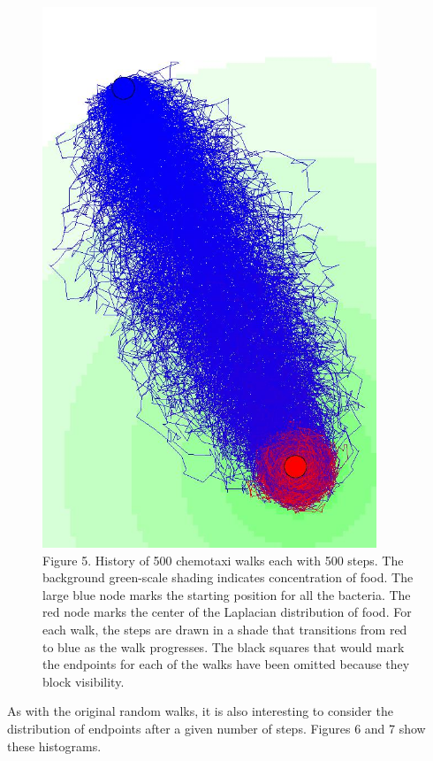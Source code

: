 \documentclass{article}
\begin{document}
\begin{figure}[h]
\centering
\includegraphics[width=10cm,keepaspectratio]{images/chemotaxi-paths-large.jpg}
\captionsetup{labelformat=empty} \caption{Figure 5. History of 500 chemotaxi walks each with 500 steps. The background green-scale shading indicates concentration of food. The large blue node marks the starting position for all the bacteria. The red node marks the center of the Laplacian distribution of food. For each walk, the steps are drawn in a shade that transitions from red to blue as the walk progresses. The black squares that would mark the endpoints for each of the walks have been omitted because they block visibility.}
\end{figure}



  As with the original random walks, it is also interesting to consider the distribution of endpoints after a given number of steps. Figures 6 and 7 show these histograms.
\end{document}
